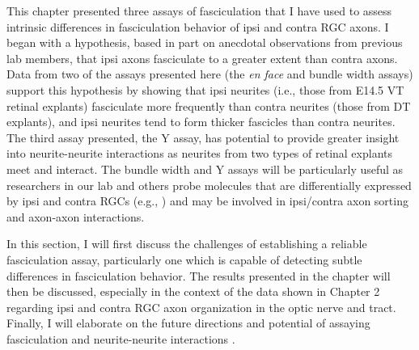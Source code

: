 This chapter presented three \invitro{} assays of fasciculation that I have used to assess intrinsic differences in fasciculation behavior of ipsi and contra RGC axons.
I began with a hypothesis, based in part on anecdotal observations from previous lab members, that ipsi axons fasciculate to a greater extent than contra axons.
Data from two of the assays presented here (the \emph{en face} and bundle width assays) support this hypothesis by showing that ipsi neurites (i.e., those from E14.5 VT retinal explants) fasciculate more frequently than contra neurites (those from DT explants), and ipsi neurites tend to form thicker fascicles than contra neurites.
The third assay presented, the Y assay, has potential to provide greater insight into neurite-neurite interactions as neurites from two types of retinal explants meet and interact.
The bundle width and Y assays will be particularly useful as researchers in our lab and others probe molecules that are differentially expressed by ipsi and contra RGCs (e.g., ) and may be involved in ipsi/contra axon sorting and axon-axon interactions.

In this section, I will first discuss the challenges of establishing a reliable fasciculation assay, particularly one which is capable of detecting subtle differences in fasciculation behavior.
The results presented in the chapter will then be discussed, especially in the context of the \invivo{} data shown in Chapter 2 regarding ipsi and contra RGC axon organization in the optic nerve and tract.
Finally, I will elaborate on the future directions and potential of assaying fasciculation and neurite-neurite interactions \invitro{}.